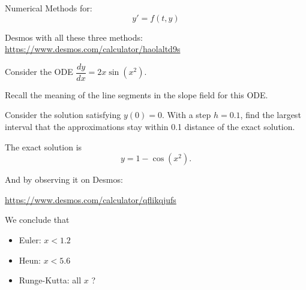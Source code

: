 \begin{slide}

\question

Numerical Methods for:
\[ y' = f(t,y) \]



\end{slide}

\begin{slide}




Desmos with all these three methods:
\hfil 
\url{https://www.desmos.com/calculator/haolaltd9s}


Consider the ODE $\dfrac{dy}{dx} = 2x\sin(x^2)$.
\begin{parts}
	\item Recall the meaning of the line segments in the slope field for this ODE.

	\item Consider the solution satisfying $y(0)=0$. With a step $h=0.1$, find the largest interval that the approximations stay within 0.1 distance of the exact solution.

\end{parts}

	
\end{slide}




\begin{solution}
\begin{slide}

The exact solution is 
\[
y = 1 - \cos(x^2).
\]

And by observing it on Desmos: 
\begin{center}
	\url{https://www.desmos.com/calculator/qflikqjufs}
\end{center}

We conclude that
\begin{itemize}
	\item Euler: $x< 1.2$
	\item Heun: $x < 5.6$
	\item Runge-Kutta: all $x$ ?
\end{itemize}
	
\end{slide}
	
\end{solution}



